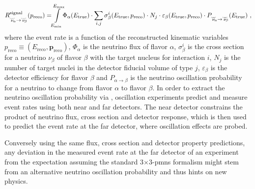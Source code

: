 %
\vspace{-3mm}
    \begin{align} \label{eq:nu_osc_prob}
        R^\text{signal}_{\overset{\brobor}{\nu}_{\hspace{-1mm}\alpha}\rightarrow\overset{\brobor}{\nu}_{\hspace{-1mm}\beta}}(p_\text{reco}) = \hspace{-1mm}\int\displaylimits_{E_\text{min}}^{E_\text{max}} \hspace{-1mm}\Phi_\alpha(E_\text{true}) \cdot \sum_{i,j} \sigma^i_\beta(E_\text{true}, p_\text{reco}) \cdot N_j \cdot \varepsilon_\beta(E_\text{true}, p_\text{reco}) \cdot P_{\overset{\brobor}{\nu}_{\hspace{-1mm}\alpha}\rightarrow\overset{\brobor}{\nu}_{\hspace{-1mm}\beta}}(E_\text{true}) \ ,
    \end{align}
where the event rate is a function of the reconstructed kinematic variables $p_\text{reco} \equiv (E_\text{reco}, \mathbf{p}_\text{reco})$, $\Phi_\alpha$ is the neutrino flux of flavor $\alpha$, $\sigma^i_\beta$ is the cross section for a neutrino $\nu_\beta$ of flavor $\beta$ with the target nucleus for interaction $i$, $N_j$ is the number of target nuclei in the detector fiducial volume of type $j$, $\varepsilon_\beta$ is the detector efficiency for flavor $\beta$ and $P_{\alpha\rightarrow\beta}$ is the neutrino oscillation probability for a neutrino to change from flavor $\alpha$ to flavor $\beta$. In order to extract the neutrino oscillation probability via , oscillation experiments predict and measure %
event rates using both near and far detectors. The near detector constrains the product of neutrino flux, cross section and detector response, which is then used to predict the event rate at the far detector, where oscillation effects are probed. 

Conversely using the same flux, cross section and detector property predictions, any deviation in the measured event rate at the far detector of an experiment from the expectation assuming the standard $3$$\times$$3$-\acrshort{pmns} formalism  might stem from an alternative neutrino oscillation probability and thus hints on new physics.

